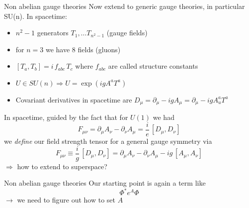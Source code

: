 \documentclass[10pt]{beamer}
\begin{document}
\begin{frame}{Non abelian gauge theories}
Now extend to generic gauge theories, in particular SU(n). In spacetime:
\begin{itemize}
    \item $n^2-1$ generators $T_{1}, \dots T_{n^2-1}$ (gauge fields)
    \item for $n=3$ we have 8 fields (gluons)
    \item $\left[T_a, T_b\right] = i \, f_{abc} \, T_c$ where $f_{abc}$ are called structure constants
    \item $U \in SU(n) \Rightarrow U = \exp(i g A^a T^a)$
    \item Covariant derivatives  in spacetime are $D_\mu = \partial_\mu - ig A_\mu = \partial_\mu - igA_u^a T^a$
\end{itemize}
In spacetime, guided by the fact that for $U(1)$ we had $$F_{\mu\nu} = \partial_\mu A_\nu - \partial_\nu A_\mu = \frac{i}{e} \, [D_\mu, D_\nu]$$
we \emph{define} our field strength tensor for a general gauge symmetry via 
\begin{equation*} 
    F_{\mu \nu} \equiv \frac{i}{g} \, [D_\mu, D_\nu] = \partial_\mu A_\nu - \partial_\nu A_\mu -ig \, [A_\mu, A_\nu]
\end{equation*}
$\Rightarrow$ how to extend to superspace?
\end{frame}

\begin{frame}{Non abelian gauge theories}
Our starting point is again a term like 
\begin{equation*}
    \Phi^* e^A \Phi
\end{equation*}
$\rightarrow$ we need to figure out how to set $A$
\end{frame}
\end{document}
